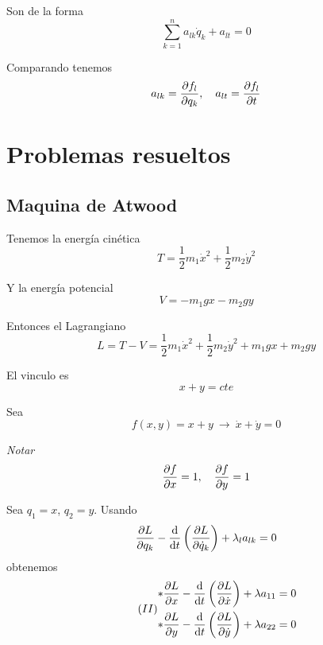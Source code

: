 \documentclass[../main]{subfiles}
\begin{document}
Son de la forma
\begin{equation}
    \sum_{k=1}^n a_{lk}\dot{q}_k+a_{lt}=0
\end{equation}

Comparando tenemos
\begin{equation}
    a_{lk}=\pdv{f_l}{q_k}, \quad a_{lt}=\pdv{f_l}{t}
\end{equation}

\section{Problemas resueltos}
\subsection{Maquina de Atwood}
Tenemos la energía cinética
\begin{equation}
    T=\dfrac{1}{2}m_1 \dot{x}^2+\dfrac{1}{2}m_2 \dot{y}^2
\end{equation}

Y la energía potencial
\begin{equation}
    V = -m_1 gx-m_2 gy
\end{equation}

Entonces el Lagrangiano
\begin{equation}
    L=T-V=\dfrac{1}{2}m_1\dot{x}^2+\dfrac{1}{2}m_2\dot{y}^2+m_1 gx+m_2 gy
\end{equation}

El vinculo es
\begin{equation}
    x+y=cte
\end{equation}

Sea 
\begin{equation}\tag{$I$}
    f(x,y)=x+y \ \rightarrow \ \dot{x}+\dot{y}=0
    \label{ec:I} 
\end{equation}

\textit{Notar}
\begin{equation*}
    \pdv{f}{x}=1, \quad \pdv{f}{y}=1
\end{equation*}

Sea $q_1=x$, $q_2=y$. Usando
\begin{equation}
    \pdv{L}{q_k}-\dv{}{t}\left(\pdv{L}{\dot{q}_k}\right)+\lambda_l a_{lk}=0
\end{equation}
obtenemos
\begin{equation}\tag{$II$}
    \begin{split}
        *\pdv{L}{x}-\dv{}{t}\left(\pdv{L}{\dot{x}}\right)+\lambda a_{11}&=0\\
        *\pdv{L}{y}-\dv{}{t}\left(\pdv{L}{\dot{y}}\right)+\lambda a_{22}&=0
    \end{split}
    \label{ec:II}
\end{equation}
\end{document}

